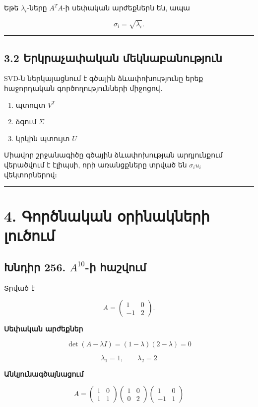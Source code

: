 \documentclass[12pt, a4paper]{article}
\begin{document}
Եթե \(\lambda_i\)-ները \(A^TA\)-ի սեփական արժեքներն են, ապա

$$
\sigma_i = \sqrt{\lambda_i}.
$$

\vspace{1em}
\hrule
\vspace{1em}

\subsection{3.2 Երկրաչափական մեկնաբանություն}

SVD-ն ներկայացնում է գծային ձևափոխությունը երեք հաջորդական գործողությունների միջոցով․

\begin{enumerate}
    \item պտույտ \(V^T\)
    \item ձգում \(\Sigma\)
    \item կրկին պտույտ \(U\)
\end{enumerate}

Միավոր շրջանագիծը գծային ձևափոխության արդյունքում վերածվում է էլիպսի, որի առանցքները տրված են \(\sigma_i u_i\) վեկտորներով։

\vspace{1em}
\hrule
\vspace{1em}

\section{4. Գործնական օրինակների լուծում}

\subsection{Խնդիր 256. \(A^{10}\)-ի հաշվում}

Տրված է

$$
A =
\begin{pmatrix}
1 & 0 \\
-1 & 2
\end{pmatrix}.
$$

\textbf{Սեփական արժեքներ}

$$
\det(A-\lambda I) = (1-\lambda)(2-\lambda)=0
$$

$$
\lambda_1 = 1, \qquad \lambda_2 = 2
$$

\textbf{Անկյունագծայնացում}

$$
A =
\begin{pmatrix}
1 & 0 \\
1 & 1
\end{pmatrix}
\begin{pmatrix}
1 & 0 \\
0 & 2
\end{pmatrix}
\begin{pmatrix}
1 & 0 \\
-1 & 1
\end{pmatrix}
$$
\end{document}
